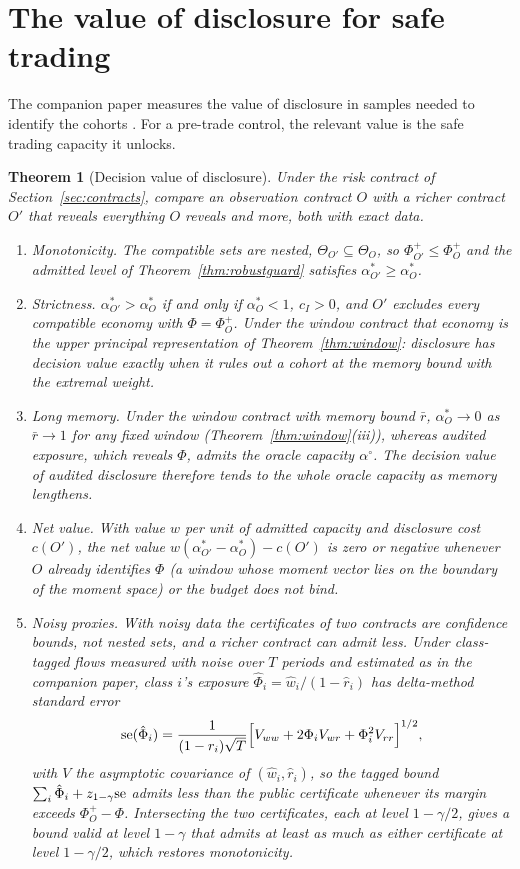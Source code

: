 \documentclass[12pt]{article}
\newtheorem{theorem}{Theorem}[section]
\theoremstyle{definition}
\theoremstyle{remark}
\begin{document}
\section{The value of disclosure for safe trading}\label{sec:disclosure}

The companion paper measures the value of disclosure in samples needed to identify the cohorts \citep{niroula2026}. For a pre-trade control, the relevant value is the safe trading capacity it unlocks.

\begin{theorem}[Decision value of disclosure]\label{thm:disclosure}
Under the risk contract of Section~\ref{sec:contracts}, compare an observation contract $O$ with a richer contract $O'$ that reveals everything $O$ reveals and more, both with exact data.
\begin{enumerate}[label=(\roman*)]
\item \emph{Monotonicity.} The compatible sets are nested, $\Theta_{O'}\subseteq\Theta_O$, so $\Phi^+_{O'}\le\Phi^+_O$ and the admitted level of Theorem~\ref{thm:robustguard} satisfies $\alpha^*_{O'}\ge\alpha^*_O$.
\item \emph{Strictness.} $\alpha^*_{O'}>\alpha^*_O$ if and only if $\alpha^*_O<1$, $c_I>0$, and $O'$ excludes every compatible economy with $\Phi=\Phi^+_O$. Under the window contract that economy is the upper principal representation of Theorem~\ref{thm:window}: disclosure has decision value exactly when it rules out a cohort at the memory bound with the extremal weight.
\item \emph{Long memory.} Under the window contract with memory bound $\bar r$, $\alpha^*_O\to0$ as $\bar r\to1$ for any fixed window (Theorem~\ref{thm:window}(iii)), whereas audited exposure, which reveals $\Phi$, admits the oracle capacity $\alpha^\circ$. The decision value of audited disclosure therefore tends to the whole oracle capacity as memory lengthens.
\item \emph{Net value.} With value $w$ per unit of admitted capacity and disclosure cost $c(O')$, the net value $w(\alpha^*_{O'}-\alpha^*_O)-c(O')$ is zero or negative whenever $O$ already identifies $\Phi$ (a window whose moment vector lies on the boundary of the moment space) or the budget does not bind.
\item \emph{Noisy proxies.} With noisy data the certificates of two contracts are confidence bounds, not nested sets, and a richer contract can admit less. Under class-tagged flows measured with noise over $T$ periods and estimated as in the companion paper, class $i$'s exposure $\hat\Phi_i=\hat w_i/(1-\hat r_i)$ has delta-method standard error
\[
{\rm se}(\hat\Phi_i)=\frac{1}{(1-r_i)\sqrt T}\Bigl[V_{ww}+2\Phi_iV_{wr}+\Phi_i^2V_{rr}\Bigr]^{1/2},
\]
with $V$ the asymptotic covariance of $(\hat w_i,\hat r_i)$, so the tagged bound $\sum_i\hat\Phi_i+z_{1-\gamma}{\rm se}$ admits less than the public certificate whenever its margin exceeds $\Phi^+_O-\Phi$. Intersecting the two certificates, each at level $1-\gamma/2$, gives a bound valid at level $1-\gamma$ that admits at least as much as either certificate at level $1-\gamma/2$, which restores monotonicity.
\end{enumerate}
\end{theorem}
\end{document}
